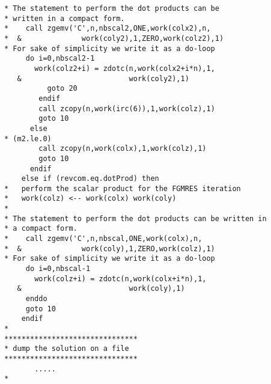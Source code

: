 \begin{landscape}
\begin{small}
\begin{multicols}{2}
\begin{verbatim}
* The statement to perform the dot products can be 
* written in a compact form.
*    call zgemv('C',n,nbscal2,ONE,work(colx2),n,
*  &              work(coly2),1,ZERO,work(colz2),1)
* For sake of simplicity we write it as a do-loop
     do i=0,nbscal2-1
       work(colz2+i) = zdotc(n,work(colx2+i*n),1,
   &                         work(coly2),1)
          goto 20
        endif
        call zcopy(n,work(irc(6)),1,work(colz),1)
        goto 10
      else
* (m2.le.0)
        call zcopy(n,work(colx),1,work(colz),1)
        goto 10
      endif
    else if (revcom.eq.dotProd) then
*   perform the scalar product for the FGMRES iteration
*   work(colz) <-- work(colx) work(coly)
*
* The statement to perform the dot products can be written in
* a compact form.
*    call zgemv('C',n,nbscal,ONE,work(colx),n,
*  &              work(coly),1,ZERO,work(colz),1)
* For sake of simplicity we write it as a do-loop
     do i=0,nbscal-1
       work(colz+i) = zdotc(n,work(colx+i*n),1,
   &                         work(coly),1)
     enddo
     goto 10
    endif
*
*******************************
* dump the solution on a file
*******************************
       .....
*
\end{verbatim}
\end{multicols}
\end{small}
\end{landscape}
